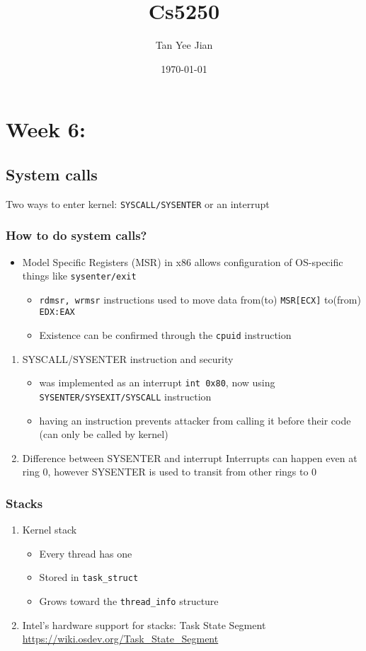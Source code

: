\documentclass[11pt]{article}
\author{Tan Yee Jian}
\date{\today}
\title{Cs5250}
\begin{document}
\maketitle
\tableofcontents


\section{Week 6:}
\label{sec:org45f5a91}
\subsection{System calls}
\label{sec:org875a619}
Two ways to enter kernel: \texttt{SYSCALL/SYSENTER} or an interrupt
\subsubsection{How to do system calls?}
\label{sec:org533d333}
\begin{itemize}
\item Model Specific Registers (MSR) in x86 allows configuration of OS-specific
things like \texttt{sysenter/exit}
\begin{itemize}
\item \texttt{rdmsr, wrmsr} instructions used to move data from(to) \texttt{MSR[ECX]} to(from) \texttt{EDX:EAX}
\item Existence can be confirmed through the \texttt{cpuid} instruction
\end{itemize}
\end{itemize}
\begin{enumerate}
\item SYSCALL/SYSENTER instruction and security
\label{sec:orge44bf73}
\begin{itemize}
\item was implemented as an interrupt \texttt{int 0x80}, now using
\texttt{SYSENTER/SYSEXIT/SYSCALL} instruction
\item having an instruction prevents attacker from calling it before their code (can
only be called by kernel)
\end{itemize}
\item Difference between SYSENTER and interrupt
\label{sec:org743bd28}
Interrupts can happen even at ring 0, however SYSENTER is used to transit from
other rings to 0
\end{enumerate}
\subsubsection{Stacks}
\label{sec:org84ecd9d}
\begin{enumerate}
\item Kernel stack
\label{sec:org59b3f2f}
\begin{itemize}
\item Every thread has one
\item Stored in \texttt{task\_struct}
\item Grows toward the \texttt{thread\_info} structure
\end{itemize}
\item Intel's hardware support for stacks: Task State Segment
\label{sec:org966b933}
\url{https://wiki.osdev.org/Task\_State\_Segment}
\end{enumerate}
\end{document}
